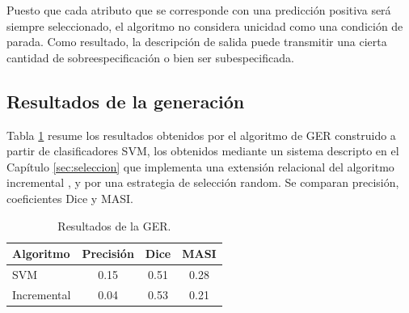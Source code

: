 Puesto que cada atributo que se corresponde con una predicci\'on positiva ser\'a siempre seleccionado, el algoritmo no considera unicidad como una condici\'on de parada. Como resultado, la descripci\'on de salida puede transmitir una cierta cantidad de sobreespecificaci\'on o bien ser subespecificada.


\subsection{Resultados de la generaci\'on }

Tabla \ref{tab-reg-results} resume los resultados obtenidos por el algoritmo de GER construido a partir de clasificadores SVM, los obtenidos mediante un sistema descripto en el Cap\'itulo \ref{sec:seleccion} que implementa una extensi\'on relacional del algoritmo incremental \cite{incremental}, y por una estrategia de selecci\'on random. Se comparan precisi\'on, coeficientes Dice y MASI.

\begin{table}[h]
\begin{center}
\begin{tabular} {  l c c c }
\hline
{Algoritmo}							& {Precisi\'on} 	& { Dice}		& MASI \\ \hline 
SVM											& 0.15		& 0.51			& 0.28 \\
Incremental							& 0.04		& 0.53			& 0.21 \\
\hline
\end{tabular}
\end{center}
\caption{Resultados de la GER.}
\label{tab-reg-results}

\end{table}



